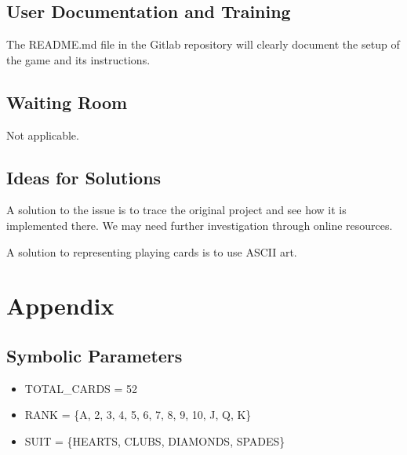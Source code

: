 \documentclass[12pt, titlepage]{article}
\begin{document}
\subsection{User Documentation and Training}
The README.md file in the Gitlab repository will clearly document the setup of the game and its instructions.

\subsection{Waiting Room}
Not applicable.

\subsection{Ideas for Solutions}
A solution to the issue is to trace the original project and see how it is implemented there. We may need further investigation through online resources. 

A solution to representing playing cards is to use ASCII art.




\newpage

\section{Appendix}
\subsection{Symbolic Parameters}
\begin{itemize}
    \item TOTAL\_CARDS = 52
    \item RANK = \{A, 2, 3, 4, 5, 6, 7, 8, 9, 10, J, Q, K\}
    \item SUIT = \{HEARTS, CLUBS, DIAMONDS, SPADES\}
\end{itemize}
\end{document}
